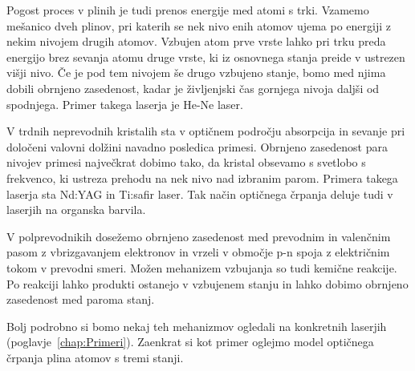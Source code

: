 Pogost proces v plinih je tudi prenos energije med atomi s trki. Vzamemo 
mešanico dveh plinov, pri katerih se nek nivo enih atomov ujema po energiji z
nekim nivojem drugih atomov. Vzbujen atom prve vrste lahko pri trku preda 
energijo brez sevanja atomu druge vrste, ki iz osnovnega stanja preide v 
ustrezen višji nivo. Če je pod tem nivojem še drugo vzbujeno stanje, bomo 
med njima dobili obrnjeno zasedenost, kadar je življenjski čas gornjega 
nivoja daljši od spodnjega. Primer takega laserja je He-Ne laser.

V trdnih neprevodnih kristalih sta v optičnem področju absorpcija
in sevanje pri določeni valovni dolžini navadno posledica primesi.
Obrnjeno zasedenost para nivojev primesi največkrat dobimo tako, da
kristal obsevamo s svetlobo s frekvenco, ki ustreza prehodu na nek
nivo nad izbranim parom. Primera takega laserja sta Nd:YAG in Ti:safir 
laser. Tak način optičnega črpanja deluje tudi v laserjih na 
organska barvila. 

V polprevodnikih dosežemo obrnjeno zasedenost med prevodnim in valenčnim
pasom z vbrizgavanjem elektronov in vrzeli v območje p-n spoja z električnim
tokom v prevodni smeri. Možen mehanizem vzbujanja so tudi kemične
reakcije. Po reakciji lahko produkti ostanejo v vzbujenem stanju
in lahko dobimo obrnjeno zasedenost med paroma stanj.

Bolj podrobno si bomo nekaj teh mehanizmov ogledali 
na konkretnih laserjih (poglavje~\ref{chap:Primeri}). Zaenkrat si kot primer oglejmo
model optičnega črpanja plina atomov s tremi stanji.

